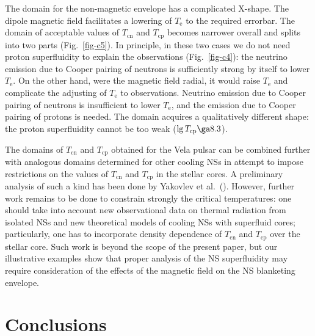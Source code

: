 \documentclass{aa}
\begin{document}
The domain for the non-magnetic envelope 
has a complicated X-shape. 
The dipole magnetic field
facilitates a lowering of $T_\mathrm{e}$ to the
required errorbar.
The domain of acceptable values
of $T_\mathrm{cn}$ and $T_\mathrm{cp}$ becomes narrower overall
and splits into two parts (Fig.\ \ref{fig-c5}).
In principle, in these two cases we do not need
proton superfluidity to explain the
observations (Fig.\ \ref{fig-c4}): the neutrino
emission due to Cooper pairing of neutrons is
sufficiently strong by itself to lower $T_\mathrm{e}$.
On the other hand, were the magnetic field radial, it would
raise $T_\mathrm{e}$ and complicate
the adjusting of $T_\mathrm{e}$ to observations.
Neutrino emission due to Cooper pairing of neutrons is
insufficient to lower $T_\mathrm{e}$, and the 
emission due to Cooper pairing of protons
is needed. The domain acquires a qualitatively
different shape: the proton superfluidity
cannot be too weak ($\lg T_\mathrm{cp} \ga 8.3$).

The domains of $T_\mathrm{cn}$ and $T_\mathrm{cp}$ obtained
for the Vela pulsar
can be combined further with analogous domains
determined for other cooling NSs in attempt
to impose restrictions on the values of
$T_\mathrm{cn}$ and $T_\mathrm{cp}$ in the stellar cores.
A preliminary analysis of such a kind has been done 
by Yakovlev et al.\ (\cite{yaketal99}). 
However, further work remains to be done
to constrain strongly the critical temperatures:
one should take into account new observational data
on thermal radiation from isolated NSs and
new theoretical models of cooling NSs
with superfluid cores; particularly,
one has to incorporate density dependence of
$T_\mathrm{cn}$ and $T_\mathrm{cp}$ over the stellar core.
Such work is beyond the scope of the present
paper, but our illustrative examples show that
proper analysis of the NS superfluidity may require
consideration of
the effects of the magnetic field on the NS blanketing envelope.

\section{Conclusions}
\end{document}
